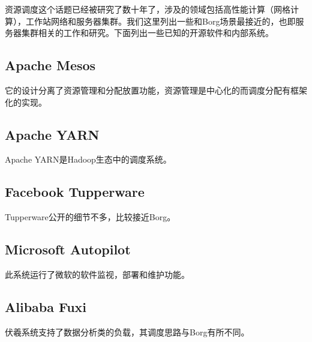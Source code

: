 资源调度这个话题已经被研究了数十年了，涉及的领域包括高性能计算（网格计算），工作站网络和服务器集群。我们这里列出一些和Borg场景最接近的，也即服务器集群相关的工作和研究。下面列出一些已知的开源软件和内部系统。

\subsection{Apache Mesos}

它的设计分离了资源管理和分配放置功能，资源管理是中心化的而调度分配有框架化的实现。

\subsection{Apache YARN}

Apache YARN是Hadoop生态中的调度系统。

\subsection{Facebook Tupperware}

Tupperware公开的细节不多，比较接近Borg。

\subsection{Microsoft Autopilot}

此系统运行了微软的软件监视，部署和维护功能。

\subsection{Alibaba Fuxi}

伏羲系统支持了数据分析类的负载，其调度思路与Borg有所不同。 

